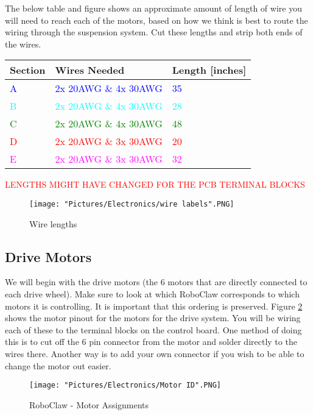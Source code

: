 \documentclass[12pt]{article}
\begin{document}
\noindent The below table and figure shows an approximate amount of length of wire you will need to reach each of the motors, based on how we think is best to route the wiring through the suspension system. Cut these lengths and strip both ends of the wires. 


\begin{tabular}[3] {| p{2cm} | p{7cm} | p{4cm} |}
	\hline
	\textbf{Section} & \textbf{Wires Needed} & \textbf{Length [inches]}  \\ \hline
	\textcolor{blue}{A} & \textcolor{blue}{2x 20AWG \& 4x 30AWG} & \textcolor{blue}{35} \\ \hline
	\textcolor{cyan}{B} & \textcolor{cyan}{2x 20AWG \& 4x 30AWG} & \textcolor{cyan}{28} \\ \hline
	\textcolor{green}{C} & \textcolor{green}{2x 20AWG \& 4x 30AWG} & \textcolor{green}{48} \\ \hline
	\textcolor{red}{D} & \textcolor{red}{2x 20AWG \& 3x 30AWG} & \textcolor{red}{20} \\ \hline
	\textcolor{magenta}{E} & \textcolor{magenta}{2x 20AWG \& 3x 30AWG} & \textcolor{magenta}{32} \\ \hline
\end{tabular}

\textcolor{red}{LENGTHS MIGHT HAVE CHANGED FOR THE PCB TERMINAL BLOCKS}

\begin{figure}[H]
 	\centering
	\texttt{[image: "Pictures/Electronics/wire labels".PNG]}
 	\caption{Wire lengths}
	\label{wire lengths}
\end{figure}

\subsection{Drive Motors}
We will begin with the drive motors (the 6 motors that are directly connected to each drive wheel). Make sure to look at which RoboClaw corresponds to which motors it is controlling. It is important that this ordering is preserved. Figure \ref{motorID} shows the motor pinout for the motors for the drive system. You will be wiring each of these to the terminal blocks on the control board. One method of doing this is to cut off the 6 pin connector from the motor and solder directly to the wires there. Another way is to add your own connector if you wish to be able to change the motor out easier.

\begin{figure}[H]
 	\centering
	\texttt{[image: "Pictures/Electronics/Motor ID".PNG]}
 	\caption{RoboClaw - Motor Assignments}
	\label{motorID}
\end{figure}
\end{document}
